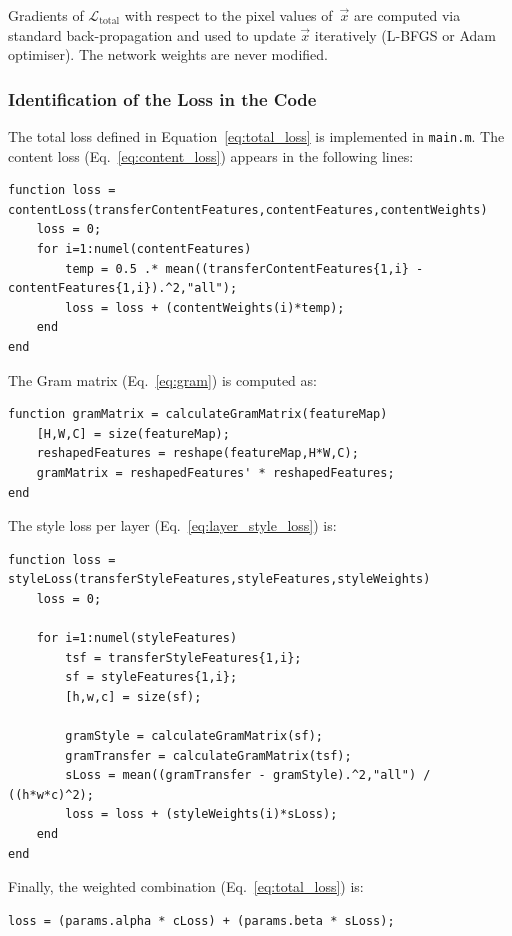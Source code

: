\documentclass{article}
\begin{document}
Gradients of $\mathcal{L}_{\text{total}}$ with respect to the pixel values
of~$\vec{x}$ are computed via standard back-propagation and used to update
$\vec{x}$ iteratively (L-BFGS or Adam optimiser). The network weights are
never modified.

\subsubsection{Identification of the Loss in the Code}

The total loss defined in Equation~\eqref{eq:total_loss} is implemented in
\texttt{main.m}. The content loss (Eq.~\ref{eq:content_loss}) appears in the
following lines:

\begin{verbatim}
function loss = contentLoss(transferContentFeatures,contentFeatures,contentWeights)
    loss = 0;
    for i=1:numel(contentFeatures)
        temp = 0.5 .* mean((transferContentFeatures{1,i} - contentFeatures{1,i}).^2,"all");
        loss = loss + (contentWeights(i)*temp);
    end
end
\end{verbatim}

The Gram matrix (Eq.~\ref{eq:gram}) is computed as:

\begin{verbatim}
function gramMatrix = calculateGramMatrix(featureMap)
    [H,W,C] = size(featureMap);
    reshapedFeatures = reshape(featureMap,H*W,C);
    gramMatrix = reshapedFeatures' * reshapedFeatures;
end
\end{verbatim}

The style loss per layer (Eq.~\ref{eq:layer_style_loss}) is:

\begin{verbatim}
function loss = styleLoss(transferStyleFeatures,styleFeatures,styleWeights)
    loss = 0;

    for i=1:numel(styleFeatures)
        tsf = transferStyleFeatures{1,i};
        sf = styleFeatures{1,i};    
        [h,w,c] = size(sf);

        gramStyle = calculateGramMatrix(sf);
        gramTransfer = calculateGramMatrix(tsf);
        sLoss = mean((gramTransfer - gramStyle).^2,"all") / ((h*w*c)^2);
        loss = loss + (styleWeights(i)*sLoss);
    end
end
\end{verbatim}

Finally, the weighted combination (Eq.~\ref{eq:total_loss}) is:

\begin{verbatim}
loss = (params.alpha * cLoss) + (params.beta * sLoss);
\end{verbatim}
\end{document}
